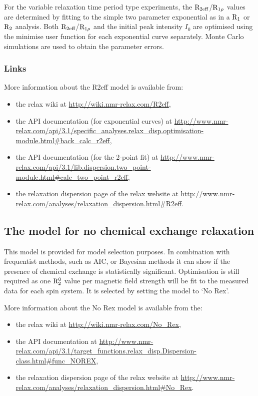 For the variable relaxation time period type experiments, the $\mathrm{R}_\textrm{2eff}$/$\mathrm{R}_{1\rho}$ values are determined by fitting to the simple two parameter exponential as in a $\mathrm{R}_1$ or $\mathrm{R}_2$ analysis.
Both $\mathrm{R}_\textrm{2eff}$/$\mathrm{R}_{1\rho}$ and the initial peak intensity $I_0$ are optimised using the minimise user function for each exponential curve separately.
Monte Carlo simulations are used to obtain the parameter errors.


\subsubsection{Links}

More information about the R2eff model is available from:
\begin{itemize}
  \item the relax wiki at \url{http://wiki.nmr-relax.com/R2eff},
  \item the API documentation (for exponential curves) at \url{http://www.nmr-relax.com/api/3.1/specific\_analyses.relax\_disp.optimisation-module.html#back\_calc\_r2eff},
  \item the API documentation (for the 2-point fit) at \url{http://www.nmr-relax.com/api/3.1/lib.dispersion.two\_point-module.html#calc\_two\_point\_r2eff},
  \item the relaxation dispersion page of the relax website at \url{http://www.nmr-relax.com/analyses/relaxation\_dispersion.html#R2eff}.
\end{itemize}



\subsection{The model for no chemical exchange relaxation}
\label{sect: dispersion: No Rex model}

This model is provided for model selection purposes.
In combination with frequentist methods, such as AIC, or Bayesian methods it can show if the presence of chemical exchange is statistically significant.
Optimisation is still required as one $\mathrm{R}_2^0$ value per magnetic field strength will be fit to the measured data for each spin system.
It is selected by setting the model to `No Rex'.

More information about the No Rex model is available from the:
\begin{itemize}
  \item the relax wiki at \url{http://wiki.nmr-relax.com/No\_Rex},
  \item the API documentation at \url{http://www.nmr-relax.com/api/3.1/target\_functions.relax\_disp.Dispersion-class.html#func\_NOREX},
  \item the relaxation dispersion page of the relax website at \url{http://www.nmr-relax.com/analyses/relaxation\_dispersion.html#No\_Rex}.
\end{itemize}



